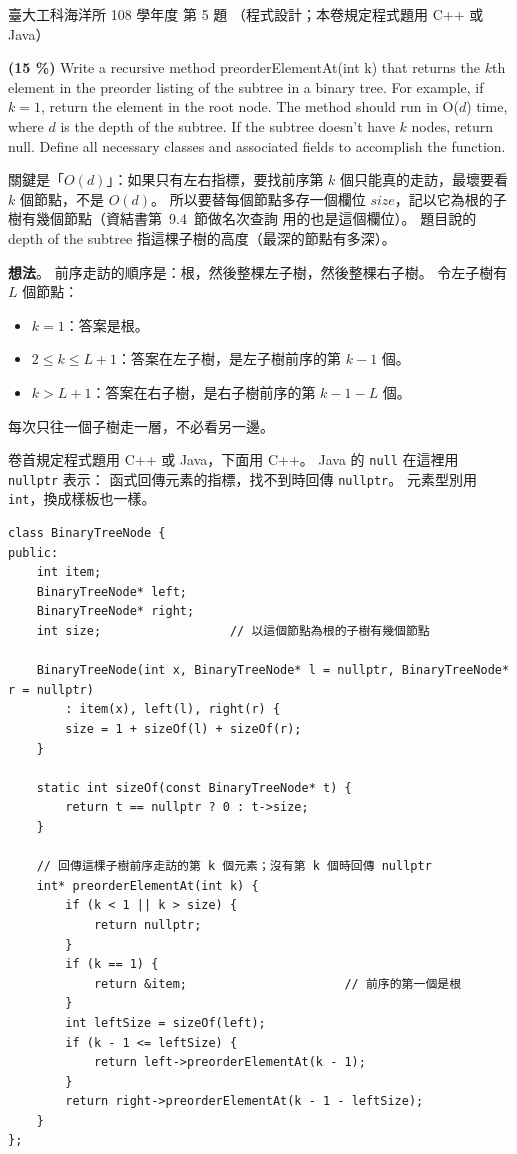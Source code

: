 \begin{pastexam}[label={px:ntu-108-esoe-ds-05}]{臺大工科海洋所 108 學年度 第 5 題}
（程式設計；本卷規定程式題用 C++ 或 Java）

\textbf{(15 \%)} Write a recursive method \textsf{preorderElementAt(int k)} that returns the $k$th
element in the preorder listing of the subtree in a binary tree. For example, if $k = 1$, return the
element in the root node. The method should run in O($d$) time, where $d$ is the depth of the
subtree. If the subtree doesn't have $k$ nodes, return null. Define all necessary classes and
associated fields to accomplish the function.
\end{pastexam}

\begin{pastsoln}
關鍵是「$O(d)$」：如果只有左右指標，要找前序第 $k$ 個只能真的走訪，最壞要看 $k$ 個節點，不是 $O(d)$。
所以要替每個節點多存一個欄位 $\mathit{size}$，記以它為根的子樹有幾個節點（資結書第~9.4~節做名次查詢
用的也是這個欄位）。 題目說的 depth of the subtree 指這棵子樹的高度（最深的節點有多深）。

\textbf{想法}。 前序走訪的順序是：根，然後整棵左子樹，然後整棵右子樹。 令左子樹有 $L$ 個節點：
\begin{itemize}
\item $k = 1$：答案是根。
\item $2 \le k \le L + 1$：答案在左子樹，是左子樹前序的第 $k - 1$ 個。
\item $k > L + 1$：答案在右子樹，是右子樹前序的第 $k - 1 - L$ 個。
\end{itemize}
每次只往一個子樹走一層，不必看另一邊。

卷首規定程式題用 C++ 或 Java，下面用 C++。 Java 的 \texttt{null} 在這裡用 \texttt{nullptr} 表示：
函式回傳元素的指標，找不到時回傳 \texttt{nullptr}。 元素型別用 \texttt{int}，換成樣板也一樣。

\begin{verbatim}
class BinaryTreeNode {
public:
    int item;
    BinaryTreeNode* left;
    BinaryTreeNode* right;
    int size;                  // 以這個節點為根的子樹有幾個節點

    BinaryTreeNode(int x, BinaryTreeNode* l = nullptr, BinaryTreeNode* r = nullptr)
        : item(x), left(l), right(r) {
        size = 1 + sizeOf(l) + sizeOf(r);
    }

    static int sizeOf(const BinaryTreeNode* t) {
        return t == nullptr ? 0 : t->size;
    }

    // 回傳這棵子樹前序走訪的第 k 個元素；沒有第 k 個時回傳 nullptr
    int* preorderElementAt(int k) {
        if (k < 1 || k > size) {
            return nullptr;
        }
        if (k == 1) {
            return &item;                      // 前序的第一個是根
        }
        int leftSize = sizeOf(left);
        if (k - 1 <= leftSize) {
            return left->preorderElementAt(k - 1);
        }
        return right->preorderElementAt(k - 1 - leftSize);
    }
};
\end{verbatim}


\end{pastsoln}
